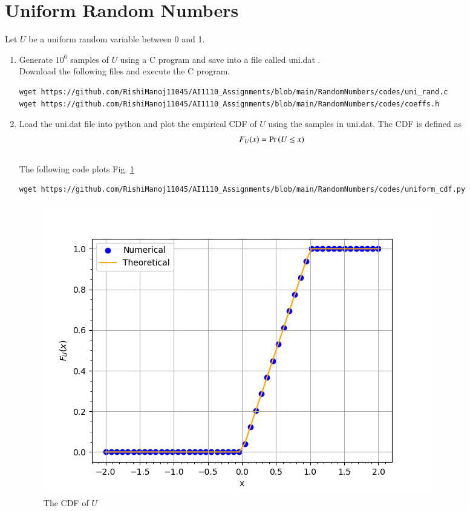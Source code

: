 \documentclass[journal,12pt,twocolumn]{IEEEtran}
\renewcommand\thesection{\arabic{section}}
\begin{document}
\section{Uniform Random Numbers}
Let $U$ be a uniform random variable between 0 and 1.
\begin{enumerate}[label=\thesection.\arabic*
,ref=\thesection.\theenumi]
\item Generate $10^6$ samples of $U$ using a C program and save into a file called uni.dat .
\\
\solution Download the following files and execute the  C program.
\begin{lstlisting}
wget https://github.com/RishiManoj11045/AI1110_Assignments/blob/main/RandomNumbers/codes/uni_rand.c
wget https://github.com/RishiManoj11045/AI1110_Assignments/blob/main/RandomNumbers/codes/coeffs.h
\end{lstlisting}
%
\item
Load the uni.dat file into python and plot the empirical CDF of $U$ using the samples in uni.dat. The CDF is defined as
\begin{align}
F_{U}(x) = \Pr\left(U \le x\right)
\end{align}
\\
\solution  The following code plots Fig. \ref{fig:uni_cdf}
\begin{lstlisting}
wget https://github.com/RishiManoj11045/AI1110_Assignments/blob/main/RandomNumbers/codes/uniform_cdf.py
\end{lstlisting}

\begin{figure}[ht]
\centering
\includegraphics[width=\columnwidth]{figs/uni_cdf.png}
\caption{The CDF of $U$}
\label{fig:uni_cdf}
\end{figure}


\end{enumerate}
\end{document}
